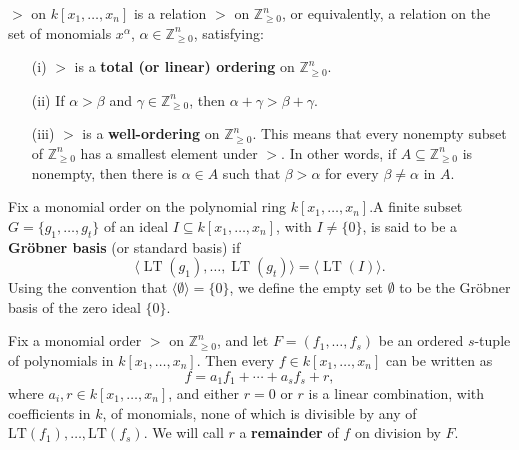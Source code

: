 \begin{definition}\label{MonomialOrder}
  \leanok
  \( > \) on \( k[x_1, \ldots, x_n] \) is a relation \( > \) on \( \mathbb{Z}_{\geq 0}^n \), or equivalently, a relation on the set of monomials \( x^\alpha \), \( \alpha \in \mathbb{Z}_{\geq 0}^n \), satisfying:

  \begin{enumerate}
      \item[(i)] \( > \) is a \textbf{total (or linear) ordering} on \( \mathbb{Z}_{\geq 0}^n \).

      \item[(ii)] If \( \alpha > \beta \) and \( \gamma \in \mathbb{Z}_{\geq 0}^n \), then \( \alpha + \gamma > \beta + \gamma \).

      \item[(iii)] \( > \) is a \textbf{well-ordering} on \( \mathbb{Z}_{\geq 0}^n \). This means that every nonempty subset of \( \mathbb{Z}_{\geq 0}^n \) has a smallest element under \( > \). In other words, if \( A \subseteq \mathbb{Z}_{\geq 0}^n \) is nonempty, then there is \( \alpha \in A \) such that \( \beta > \alpha \) for every \( \beta \neq \alpha \) in \( A \).
  \end{enumerate}
\end{definition}

\begin{definition}\label{IsGroebnerBasis}
  \leanok
  Fix a monomial order on the polynomial ring $k[x_1, \ldots, x_n]$.A finite subset $G = \{g_1, \ldots, g_t\}$ of an ideal $I \subseteq k[x_1, \ldots, x_n]$, with $I \ne \{0\}$, is said to be a \textbf{Gröbner basis} (or standard basis) if
  \[
  \langle \operatorname{LT}(g_1), \ldots, \operatorname{LT}(g_t) \rangle = \langle \operatorname{LT}(I) \rangle.
  \]
  Using the convention that $\langle \emptyset \rangle = \{0\}$, we define the empty set $\emptyset$ to be the Gröbner basis of the zero ideal $\{0\}$.
\end{definition}

\begin{definition}\label{IsRemainder}
  \leanok
  Fix a monomial order \(>\) on \(\mathbb{Z}_{\geq 0}^n\), and let
  \(F = (f_1, \ldots, f_s)\) be an ordered \(s\)-tuple of polynomials in \(k[x_1, \ldots, x_n]\).
  Then every \(f \in k[x_1, \ldots, x_n]\) can be written as
  \[
  f = a_1 f_1 + \cdots + a_s f_s + r,
  \]
  where \(a_i, r \in k[x_1, \ldots, x_n]\), and either \(r = 0\) or \(r\) is a linear combination, with coefficients in \(k\), of monomials, none of which is divisible by any of \(\mathrm{LT}(f_1), \ldots, \mathrm{LT}(f_s)\).
  We will call \(r\) a \textbf{remainder} of \(f\) on division by \(F\).
\end{definition}

